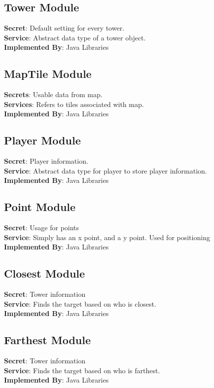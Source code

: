 \documentclass[12,english]{article}
\begin{document}
    \subsection{Tower Module}
	\textbf{Secret}: Default setting for every tower. \\
	\textbf{Service}: Abstract data type of a tower object.\\
	\textbf{Implemented By}: Java Libraries 
	
	\subsection{MapTile Module}
	\textbf{Secrets}: Usable data from map. \\
	\textbf{Services}: Refers to tiles associated with map.  \\
	\textbf{Implemented By}:  Java Libraries\\
	
	\subsection{Player Module}
	\textbf{Secret}: Player information.  \\
	\textbf{Service}: Abstract data type for player to store player information. \\
	\textbf{Implemented By}: Java Libraries \\
	
	\subsection{Point Module}
	\textbf{Secret}: Usage for points \\
	\textbf{Service}: Simply has an x point, and a y point. Used for positioning  \\ 
	\textbf{Implemented By}: Java Libraries\\
	
	\subsection{Closest Module}
	\textbf{Secret}: Tower information \\
	\textbf{Service}: Finds the target based on who is closest.  \\ 
	\textbf{Implemented By}: Java Libraries\\
	
	\subsection{Farthest Module}
	\textbf{Secret}: Tower information \\
	\textbf{Service}: Finds the target based on who is farthest. \\ 
	\textbf{Implemented By}: Java Libraries\\
	
\end{document}
